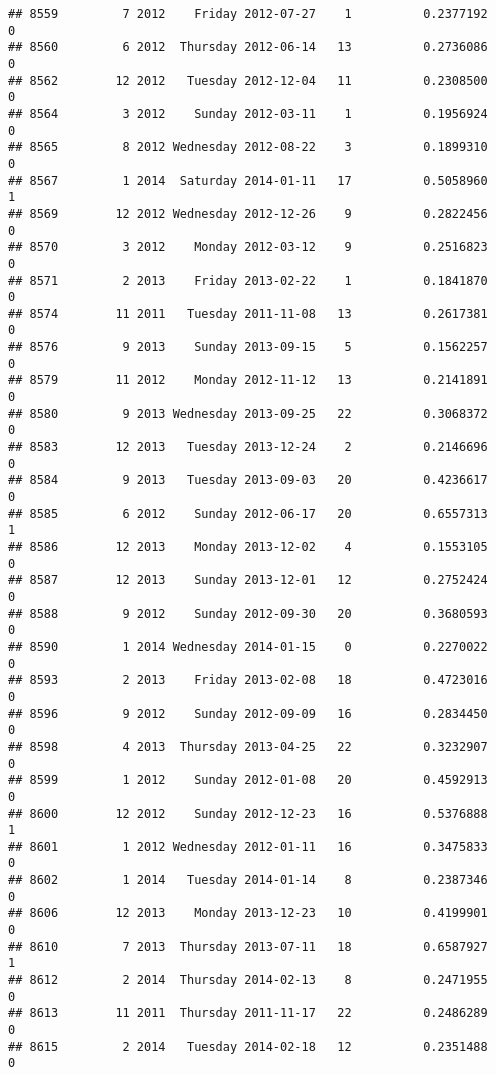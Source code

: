 \documentclass[
]{article}
\begin{document}
\begin{verbatim}
## 8559         7 2012    Friday 2012-07-27    1          0.2377192             0
## 8560         6 2012  Thursday 2012-06-14   13          0.2736086             0
## 8562        12 2012   Tuesday 2012-12-04   11          0.2308500             0
## 8564         3 2012    Sunday 2012-03-11    1          0.1956924             0
## 8565         8 2012 Wednesday 2012-08-22    3          0.1899310             0
## 8567         1 2014  Saturday 2014-01-11   17          0.5058960             1
## 8569        12 2012 Wednesday 2012-12-26    9          0.2822456             0
## 8570         3 2012    Monday 2012-03-12    9          0.2516823             0
## 8571         2 2013    Friday 2013-02-22    1          0.1841870             0
## 8574        11 2011   Tuesday 2011-11-08   13          0.2617381             0
## 8576         9 2013    Sunday 2013-09-15    5          0.1562257             0
## 8579        11 2012    Monday 2012-11-12   13          0.2141891             0
## 8580         9 2013 Wednesday 2013-09-25   22          0.3068372             0
## 8583        12 2013   Tuesday 2013-12-24    2          0.2146696             0
## 8584         9 2013   Tuesday 2013-09-03   20          0.4236617             0
## 8585         6 2012    Sunday 2012-06-17   20          0.6557313             1
## 8586        12 2013    Monday 2013-12-02    4          0.1553105             0
## 8587        12 2013    Sunday 2013-12-01   12          0.2752424             0
## 8588         9 2012    Sunday 2012-09-30   20          0.3680593             0
## 8590         1 2014 Wednesday 2014-01-15    0          0.2270022             0
## 8593         2 2013    Friday 2013-02-08   18          0.4723016             0
## 8596         9 2012    Sunday 2012-09-09   16          0.2834450             0
## 8598         4 2013  Thursday 2013-04-25   22          0.3232907             0
## 8599         1 2012    Sunday 2012-01-08   20          0.4592913             0
## 8600        12 2012    Sunday 2012-12-23   16          0.5376888             1
## 8601         1 2012 Wednesday 2012-01-11   16          0.3475833             0
## 8602         1 2014   Tuesday 2014-01-14    8          0.2387346             0
## 8606        12 2013    Monday 2013-12-23   10          0.4199901             0
## 8610         7 2013  Thursday 2013-07-11   18          0.6587927             1
## 8612         2 2014  Thursday 2014-02-13    8          0.2471955             0
## 8613        11 2011  Thursday 2011-11-17   22          0.2486289             0
## 8615         2 2014   Tuesday 2014-02-18   12          0.2351488             0

\end{verbatim}
\end{document}
